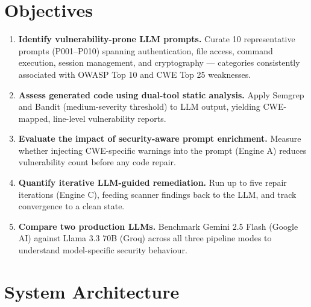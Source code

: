 \documentclass[11pt,a4paper]{article}
\begin{document}
\section{Objectives}

\begin{enumerate}[leftmargin=*, label=\textbf{O\arabic*.}]
  \item \textbf{Identify vulnerability-prone LLM prompts.} Curate 10 representative prompts (P001–P010) spanning authentication, file access, command execution, session management, and cryptography — categories consistently associated with OWASP Top 10 and CWE Top 25 weaknesses.
  \item \textbf{Assess generated code using dual-tool static analysis.} Apply Semgrep and Bandit (medium-severity threshold) to LLM output, yielding CWE-mapped, line-level vulnerability reports.
  \item \textbf{Evaluate the impact of security-aware prompt enrichment.} Measure whether injecting CWE-specific warnings into the prompt (Engine A) reduces vulnerability count before any code repair.
  \item \textbf{Quantify iterative LLM-guided remediation.} Run up to five repair iterations (Engine C), feeding scanner findings back to the LLM, and track convergence to a clean state.
  \item \textbf{Compare two production LLMs.} Benchmark Gemini 2.5 Flash (Google AI) against Llama 3.3 70B (Groq) across all three pipeline modes to understand model-specific security behaviour.
\end{enumerate}

\section{System Architecture}
\end{document}
